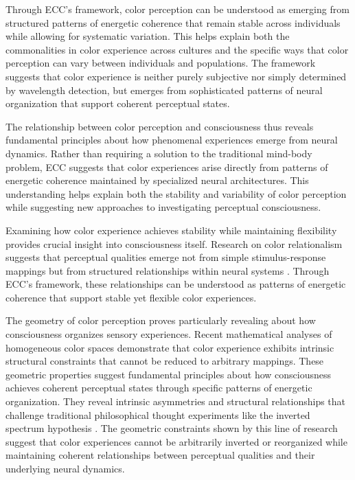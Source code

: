 Through ECC's framework, color perception can be understood as emerging from structured patterns of energetic coherence that remain stable across individuals while allowing for systematic variation. This helps explain both the commonalities in color experience across cultures and the specific ways that color perception can vary between individuals and populations. The framework suggests that color experience is neither purely subjective nor simply determined by wavelength detection, but emerges from sophisticated patterns of neural organization that support coherent perceptual states.

The relationship between color perception and consciousness thus reveals fundamental principles about how phenomenal experiences emerge from neural dynamics. Rather than requiring a solution to the traditional mind-body problem, ECC suggests that color experiences arise directly from patterns of energetic coherence maintained by specialized neural architectures. This understanding helps explain both the stability and variability of color perception while suggesting new approaches to investigating perceptual consciousness.

Examining how color experience achieves stability while maintaining flexibility provides crucial insight into consciousness itself. Research on color relationalism suggests that perceptual qualities emerge not from simple stimulus-response mappings but from structured relationships within neural systems \cite{ByrneHilbert2017}. Through ECC's framework, these relationships can be understood as patterns of energetic coherence that support stable yet flexible color experiences.

The geometry of color perception proves particularly revealing about how consciousness organizes sensory experiences. Recent mathematical analyses of homogeneous color spaces \cite{Provenzi2020} demonstrate that color experience exhibits intrinsic structural constraints that cannot be reduced to arbitrary mappings. These geometric properties suggest fundamental principles about how consciousness achieves coherent perceptual states through specific patterns of energetic organization. They reveal intrinsic asymmetries and structural relationships that challenge traditional philosophical thought experiments like the inverted spectrum hypothesis \cite{Block1990}. The geometric constraints shown by this line of research suggest that color experiences cannot be arbitrarily inverted or reorganized while maintaining coherent relationships between perceptual qualities and their underlying neural dynamics.

